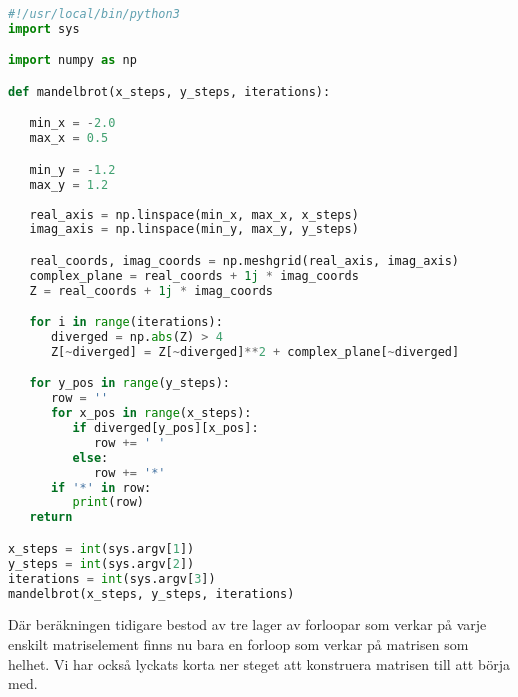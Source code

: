 \documentclass[10pt, twoside,a4paper]{article}
\begin{document}
\begin{lstlisting}[language=python]
#!/usr/local/bin/python3
import sys

import numpy as np

def mandelbrot(x_steps, y_steps, iterations):

   min_x = -2.0
   max_x = 0.5

   min_y = -1.2
   max_y = 1.2
   
   real_axis = np.linspace(min_x, max_x, x_steps)
   imag_axis = np.linspace(min_y, max_y, y_steps)

   real_coords, imag_coords = np.meshgrid(real_axis, imag_axis)
   complex_plane = real_coords + 1j * imag_coords
   Z = real_coords + 1j * imag_coords

   for i in range(iterations):
      diverged = np.abs(Z) > 4
      Z[~diverged] = Z[~diverged]**2 + complex_plane[~diverged]

   for y_pos in range(y_steps):
      row = ''
      for x_pos in range(x_steps):
         if diverged[y_pos][x_pos]:
            row += ' '
         else:
            row += '*'
      if '*' in row:
         print(row)
   return

x_steps = int(sys.argv[1])
y_steps = int(sys.argv[2])
iterations = int(sys.argv[3])
mandelbrot(x_steps, y_steps, iterations)
\end{lstlisting}
Där beräkningen tidigare bestod av tre lager av forloopar som verkar på varje enskilt matriselement finns nu bara en forloop som verkar på matrisen som helhet. Vi har också lyckats korta ner steget att konstruera matrisen till att börja med.


\newpage
\end{document}
